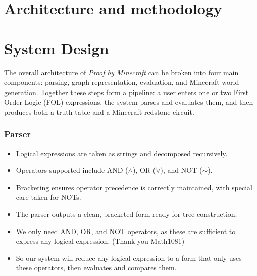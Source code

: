 \documentclass[11pt]{diazessay} %
\begin{document}
\section*{Architecture and methodology}

\section{System Design}

The overall architecture of \textit{Proof by Minecraft} can be broken into four
main components: parsing, graph representation, evaluation, and Minecraft
world generation. Together these steps form a pipeline: a user enters one
or two First Order Logic (FOL) expressions, the system parses and evaluates
them, and then produces both a truth table and a Minecraft redstone circuit.

\subsubsection*{Parser}
\begin{itemize}
    \item Logical expressions are taken as strings and decomposed recursively.
    \item Operators supported include AND ($\wedge$), OR ($\vee$), and NOT ($\sim$).
    \item Bracketing ensures operator precedence is correctly maintained, with 
    special care taken for NOTs.
    \item The parser outputs a clean, bracketed form ready for tree construction.
    \item We only need AND, OR, and NOT operators, as these are sufficient to express any logical expression. (Thank you Math1081)
    \item So our system will reduce any logical expression to a form that only uses these operators, then evaluates and compares them.
\end{itemize}
\end{document}
